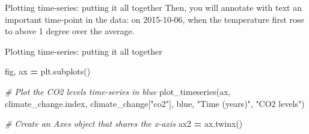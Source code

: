 \documentclass[
  ignorenonframetext,
]{beamer}
\newenvironment{Shaded}{\begin{snugshade}}{\end{snugshade}}
\newcommand{\CommentTok}[1]{\textcolor[rgb]{0.56,0.35,0.01}{\textit{#1}}}
\newcommand{\NormalTok}[1]{#1}
\newcommand{\OperatorTok}[1]{\textcolor[rgb]{0.81,0.36,0.00}{\textbf{#1}}}
\newcommand{\StringTok}[1]{\textcolor[rgb]{0.31,0.60,0.02}{#1}}
\begin{document}
\begin{frame}{Plotting time-series: putting it all together}
\label{plotting-time-series-putting-it-all-together-3}
Then, you will annotate with text an important time-point in the data:
on 2015-10-06, when the temperature first rose to above 1 degree over
the average.
\end{frame}

\begin{frame}[fragile]{Plotting time-series: putting it all together}
\label{plotting-time-series-putting-it-all-together-4}

\begin{Shaded}
\begin{Highlighting}[]

\NormalTok{fig, ax }\OperatorTok{=}\NormalTok{ plt.subplots()}

\CommentTok{\# Plot the CO2 levels time{-}series in blue}
\NormalTok{plot\_timeseries(ax, climate\_change.index, climate\_change[}\StringTok{"co2"}\NormalTok{], }\StringTok{\textquotesingle{}blue\textquotesingle{}}\NormalTok{, }\StringTok{"Time (years)"}\NormalTok{, }\StringTok{"CO2 levels"}\NormalTok{)}

\CommentTok{\# Create an Axes object that shares the x{-}axis}
\NormalTok{ax2 }\OperatorTok{=}\NormalTok{ ax.twinx()}
\end{Highlighting}
\end{Shaded}
\end{frame}
\end{document}
